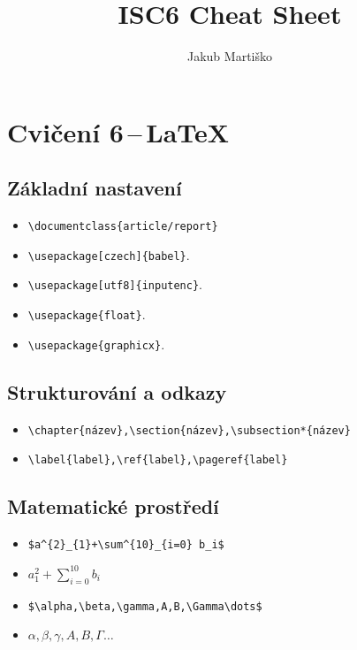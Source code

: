 \documentclass{article}
\title{ISC6 Cheat Sheet}
\author{Jakub Martiško}
\begin{document}
\section*{Cvičení 6\,--\,\LaTeX}
\subsection*{Základní nastavení}
\begin{itemize}
  \item{\verb|\documentclass{article/report}|}
  \item{\verb|\usepackage[czech]{babel}|.}
  \item{\verb|\usepackage[utf8]{inputenc}|.}
  \item{\verb|\usepackage{float}|.}
  \item{\verb|\usepackage{graphicx}|.}
\end{itemize}
\subsection*{Strukturování a odkazy}
\begin{itemize}
  \item{\verb|\chapter{název},\section{název},\subsection*{název}|}
  \item{\verb|\label{label},\ref{label},\pageref{label}|}
\end{itemize}
\subsection*{Matematické prostředí}
\begin{itemize}
  \item{\verb|$a^{2}_{1}+\sum^{10}_{i=0} b_i$|}
  \item{$a^{2}_{1}+\sum^{10}_{i=0} b_i$}
  \item{\verb|$\alpha,\beta,\gamma,A,B,\Gamma\dots$|}
  \item{$\alpha,\beta,\gamma,A,B,\Gamma\dots$}
\end{itemize}
\end{document}
